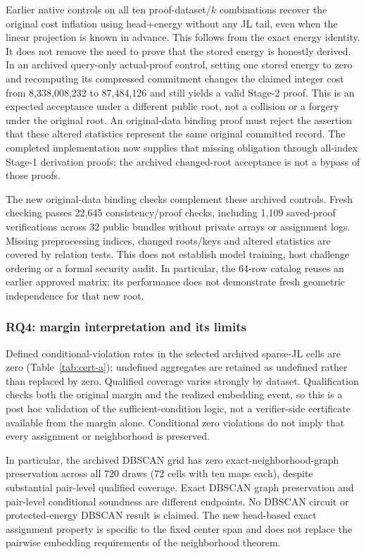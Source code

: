 Earlier native controls on all ten proof-dataset/$k$ combinations recover the original cost inflation using head+energy without any JL tail, even when the linear projection is known in advance. This follows from the exact energy identity. It does not remove the need to prove that the stored energy is honestly derived. In an archived query-only actual-proof control, setting one stored energy to zero and recomputing its compressed commitment changes the claimed integer cost from 8,338,008,232 to 87,484,126 and still yields a valid Stage-2 proof. This is an expected acceptance under a different public root, not a collision or a forgery under the original root. An original-data binding proof must reject the assertion that these altered statistics represent the same original committed record. The completed implementation now supplies that missing obligation through all-index Stage-1 derivation proofs; the archived changed-root acceptance is not a bypass of those proofs.

The new original-data binding checks complement these archived controls. Fresh checking passes 22,645 consistency/proof checks, including 1,109 saved-proof verifications across 32 public bundles without private arrays or assignment logs. Missing preprocessing indices, changed roots/keys and altered statistics are covered by relation tests. This does not establish model training, host challenge ordering or a formal security audit. In particular, the 64-row catalog reuses an earlier approved matrix; its performance does not demonstrate fresh geometric independence for that new root.

\subsubsection{RQ4: margin interpretation and its limits}
Defined conditional-violation rates in the selected archived sparse-JL cells are zero (Table~\ref{tab:cert-a}); undefined aggregates are retained as undefined rather than replaced by zero. Qualified coverage varies strongly by dataset. Qualification checks both the original margin and the realized embedding event, so this is a post hoc validation of the sufficient-condition logic, not a verifier-side certificate available from the margin alone. Conditional zero violations do not imply that every assignment or neighborhood is preserved.


In particular, the archived DBSCAN grid has zero exact-neighborhood-graph preservation across all 720 draws (72 cells with ten maps each), despite substantial pair-level qualified coverage. Exact DBSCAN graph preservation and pair-level conditional soundness are different endpoints. No DBSCAN circuit or protected-energy DBSCAN result is claimed. The new head-based exact assignment property is specific to the fixed center span and does not replace the pairwise embedding requirements of the neighborhood theorem.

